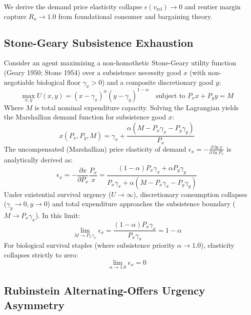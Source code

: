 \documentclass[preprint,12pt,authoryear]{elsarticle}
\theoremstyle{definition}
\begin{document}
We derive the demand price elasticity collapse $\epsilon(v_{\text{rel}}) \to 0$ and rentier margin capture $R_a \to 1.0$ from foundational consumer and bargaining theory.

\subsection{Stone-Geary Subsistence Exhaustion}

Consider an agent maximizing a non-homothetic Stone-Geary utility function (Geary 1950; Stone 1954) over a subsistence necessity good $x$ (with non-negotiable biological floor $\gamma_x > 0$) and a composite discretionary good $y$:  
$$\max_{x, y} U(x, y) = (x - \gamma_x)^{\alpha} (y - \gamma_y)^{1-\alpha} \quad \text{subject to } P_x x + P_y y = M$$  
Where $M$ is total nominal expenditure capacity. Solving the Lagrangian yields the Marshallian demand function for subsistence good $x$:  
$$x(P_x, P_y, M) = \gamma_x + \frac{\alpha (M - P_x \gamma_x - P_y \gamma_y)}{P_x}$$  
The uncompensated (Marshallian) price elasticity of demand $\epsilon_x = -\frac{\partial \ln x}{\partial \ln P_x}$ is analytically derived as:  
$$\epsilon_x = -\frac{\partial x}{\partial P_x} \frac{P_x}{x} = \frac{(1 - \alpha) P_x \gamma_x + \alpha P_y \gamma_y}{P_x \gamma_x + \alpha (M - P_x \gamma_x - P_y \gamma_y)}$$  
Under existential survival urgency ($U \to \infty$), discretionary consumption collapses ($\gamma_y \to 0, y \to 0$) and total expenditure approaches the subsistence boundary ($M \to P_x \gamma_x$). In this limit:  
$$\lim_{M \to P_x \gamma_x} \epsilon_x = \frac{(1 - \alpha) P_x \gamma_x}{P_x \gamma_x} = 1 - \alpha$$  
For biological survival staples (where subsistence priority $\alpha \to 1.0$), elasticity collapses strictly to zero:  
$$\lim_{\alpha \to 1.0} \epsilon_x = 0$$

\subsection{Rubinstein Alternating-Offers Urgency Asymmetry}
\end{document}
